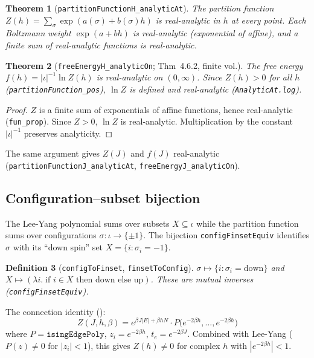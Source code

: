 \documentclass[a4paper,11pt]{article}
\newtheorem{theorem}{Theorem}
\newtheorem{definition}[theorem]{Definition}
\begin{document}
\begin{theorem}[\texttt{partitionFunctionH\_analyticAt}]
The partition function $Z(h) = \sum_\sigma \exp(a(\sigma) + b(\sigma) h)$
is real-analytic in $h$ at every point.  Each Boltzmann weight
$\exp(a + bh)$ is real-analytic (exponential of affine),
and a finite sum of real-analytic functions is real-analytic.
\end{theorem}

\begin{theorem}[\texttt{freeEnergyH\_analyticOn}; Thm~4.6.2, finite vol.]
The free energy $f(h) = |\iota|^{-1} \ln Z(h)$ is real-analytic on $(0,\infty)$.
Since $Z(h) > 0$ for all $h$ (\texttt{partitionFunction\_pos}), $\ln Z$
is defined and real-analytic (\texttt{AnalyticAt.log}).
\end{theorem}

\begin{proof}
$Z$ is a finite sum of exponentials of affine functions,
hence real-analytic (\texttt{fun\_prop}).  Since $Z > 0$,
$\ln Z$ is real-analytic.  Multiplication by the constant
$|\iota|^{-1}$ preserves analyticity.
\end{proof}

The same argument gives $Z(J)$ and $f(J)$ real-analytic
(\texttt{partitionFunctionJ\_analyticAt}, \texttt{freeEnergyJ\_analyticOn}).

\subsection{Configuration--subset bijection}

The Lee-Yang polynomial sums over subsets $X \subseteq \iota$
while the partition function sums over configurations
$\sigma : \iota \to \{\pm 1\}$.
The bijection \texttt{configFinsetEquiv} identifies $\sigma$ with
its ``down spin'' set $X = \{i : \sigma_i = -1\}$.

\begin{definition}[\texttt{configToFinset}, \texttt{finsetToConfig}]
$\sigma \mapsto \{i : \sigma_i = \mathrm{down}\}$ and
$X \mapsto (\lambda i.\;\text{if } i \in X \text{ then down else up})$.
These are mutual inverses (\texttt{configFinsetEquiv}).
\end{definition}

The connection identity
(\cite[{(3.63)--(3.65), pp.~122--123}]{friedli-velenik}):
\[
  Z(J, h, \beta) = e^{\beta J|E| + \beta h N} \cdot
  P\bigl(e^{-2\beta h}, \ldots, e^{-2\beta h}\bigr)
\]
where $P = \texttt{isingEdgePoly}$, $z_i = e^{-2\beta h}$,
$t_e = e^{-2\beta J}$.
Combined with Lee-Yang ($P(z) \ne 0$ for $|z_i| < 1$), this gives
$Z(h) \ne 0$ for complex $h$ with $|e^{-2\beta h}| < 1$.
\end{document}
